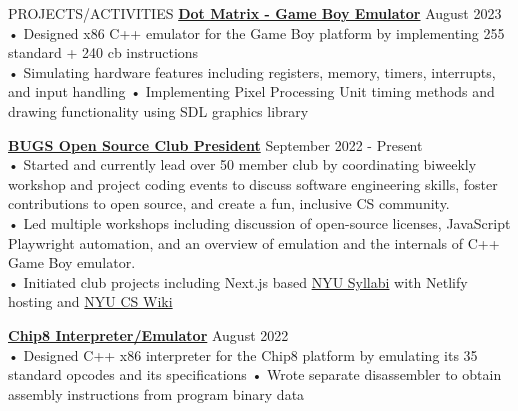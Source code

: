 \documentclass{resume} %
\begin{document}
\begin{rSection}{PROJECTS/ACTIVITIES}
\textbf{\href{https://github.com/aminoa/dot-matrix}{Dot Matrix - Game Boy Emulator}} \hfill August 2023 \\
• Designed x86 C++ emulator for the Game Boy platform by implementing 255 standard + 240 cb instructions \\
• Simulating hardware features including registers, memory, timers, interrupts, and input handling \newline
• Implementing Pixel Processing Unit timing methods and drawing functionality using SDL graphics library

\textbf{\href{https://bugsnyu.com/}{BUGS Open Source Club President}} \hfill September 2022 - Present \\
• Started and currently lead over 50 member club by coordinating biweekly workshop and project coding events to discuss software engineering skills, foster contributions to open source, and create a fun, inclusive CS community. \\
• Led multiple workshops including discussion of open-source licenses, JavaScript Playwright automation, and an overview of emulation and the internals of C++ Game Boy emulator. \\
• Initiated club projects including Next.js based \href{https://www.nyusyllabi.com}{NYU Syllabi} with Netlify hosting and \href{https://nyucswiki.com/}{NYU CS Wiki} 


\textbf{\href{https://github.com/aminoa/chip8}{Chip8 Interpreter/Emulator}} \hfill August 2022 \\
• Designed C++ x86 interpreter for the Chip8 platform by emulating its 35 standard opcodes and its specifications \newline
• Wrote separate disassembler to obtain assembly instructions from program binary data



\end{rSection}
\end{document}
